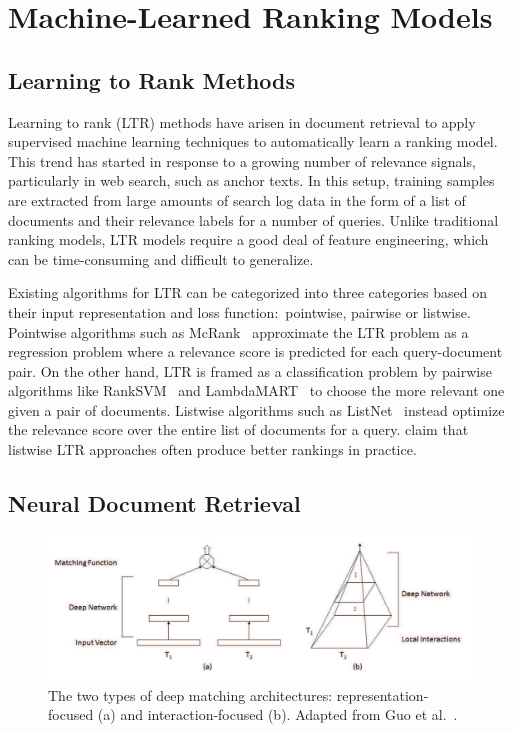 \section{Machine-Learned Ranking Models}


\subsection{Learning to Rank Methods}

Learning to rank (LTR) methods have arisen in document retrieval to apply supervised machine learning techniques to automatically learn a ranking model.
This trend has started in response to a growing number of relevance signals, particularly in web search, such as anchor texts.
In this setup, training samples are extracted from large amounts of search log data in the form of a list of documents and their relevance labels for a number of queries.
Unlike traditional ranking models, LTR models require a good deal of feature engineering, which can be time-consuming and difficult to generalize.

Existing algorithms for LTR can be categorized into three categories based on their input representation and loss function:\ pointwise, pairwise or listwise.~\cite{liu2011learning}
Pointwise algorithms such as McRank~\cite{li2008mcrank} approximate the LTR problem as a regression problem where a relevance score is predicted for each query-document pair.
On the other hand, LTR is framed as a classification problem by pairwise algorithms like RankSVM~\cite{joachims2002optimizing} and LambdaMART~\cite{burges2010ranknet} to choose the more relevant one given a pair of documents.
Listwise algorithms such as ListNet~\cite{cao2007learning} instead optimize the relevance score over the entire list of documents for a query.
\cite{liu2011learning} claim that listwise LTR approaches often produce better rankings in practice.

\subsection{Neural Document Retrieval}
\label{neural-retrieval}

\begin{figure}[t!]
\centering
  \includegraphics[width=5in]{deep_matching.png}
\caption{The two types of deep matching architectures: representation-focused (a) and interaction-focused (b). Adapted from Guo et al.~\cite{guo2017drmm}.}
\label{fig:deep_matching}
\end{figure}

